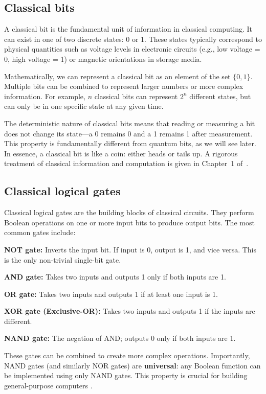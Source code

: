 \documentclass[a4paper,12pt]{amsart}
\begin{document}
\subsection{Classical bits}
A classical bit is the fundamental unit of information in classical computing. It can exist in one of two discrete states: 0 or 1. These states typically correspond to physical quantities such as voltage levels in electronic circuits (e.g., low voltage = 0, high voltage = 1) or magnetic orientations in storage media.

Mathematically, we can represent a classical bit as an element of the set $\{0, 1\}$. Multiple bits can be combined to represent larger numbers or more complex information. For example, $n$ classical bits can represent $2^n$ different states, but can only be in one specific state at any given time.

The deterministic nature of classical bits means that reading or measuring a bit does not change its state—a 0 remains 0 and a 1 remains 1 after measurement. This property is fundamentally different from quantum bits, as we will see later. In essence, a classical bit is like a coin: either heads or tails up. A rigorous treatment of classical information and computation is given in Chapter~1 of~\cite{nielsen2011quantum}.

\subsection{Classical logical gates}
Classical logical gates are the building blocks of classical circuits. They perform Boolean operations on one or more input bits to produce output bits. The most common gates include:

\textbf{NOT gate:} Inverts the input bit. If input is 0, output is 1, and vice versa. This is the only non-trivial single-bit gate.

\textbf{AND gate:} Takes two inputs and outputs 1 only if both inputs are 1.

\textbf{OR gate:} Takes two inputs and outputs 1 if at least one input is 1.

\textbf{XOR gate (Exclusive-OR):} Takes two inputs and outputs 1 if the inputs are different.

\textbf{NAND gate:} The negation of AND; outputs 0 only if both inputs are 1.

These gates can be combined to create more complex operations. Importantly, NAND gates (and similarly NOR gates) are \textbf{universal}: any Boolean function can be implemented using only NAND gates. This property is crucial for building general-purpose computers \cite{nielsen2011quantum, yanofsky2008quantum}.
\end{document}
